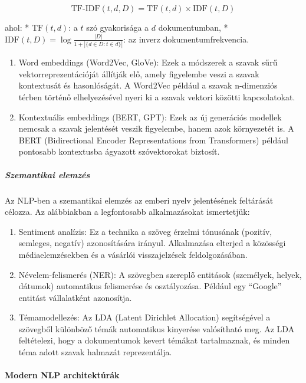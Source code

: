 \documentclass[11pt]{article}
\begin{document}
\[\text{TF-IDF}(t, d, D) = \text{TF}(t, d) \times \text{IDF}(t, D)\]

ahol: * \(\text{TF}(t, d)\): a \(t\) szó gyakorisága a \(d\)
dokumentumban, *
\(\text{IDF}(t, D) = \log \frac{|D|}{1 + |\{d \in D : t \in d\}|}\): az
inverz dokumentumfrekvencia.

\begin{enumerate}
\def\labelenumi{\arabic{enumi}.}
\setcounter{enumi}{2}
\item
  Word embeddings (Word2Vec, GloVe): Ezek a módszerek a szavak sűrű
  vektorreprezentációját állítják elő, amely figyelembe veszi a szavak
  kontextusát és hasonlóságát. A Word2Vec például a szavak n-dimenziós
  térben történő elhelyezésével nyeri ki a szavak vektori közötti
  kapcsolatokat.
\item
  Kontextuális embeddings (BERT, GPT): Ezek az új generációs modellek
  nemcsak a szavak jelentését veszik figyelembe, hanem azok környezetét
  is. A BERT (Bidirectional Encoder Representations from Transformers)
  például pontosabb kontextusba ágyazott szóvektorokat biztosít.
\end{enumerate}

\subparagraph{Szemantikai elemzés}\label{szemantikai-elemzuxe9s}

Az NLP-ben a szemantikai elemzés az emberi nyelv jelentésének feltárását
célozza. Az alábbiakban a legfontosabb alkalmazásokat ismertetjük:

\begin{enumerate}
\def\labelenumi{\arabic{enumi}.}
\item
  Sentiment analízis: Ez a technika a szöveg érzelmi tónusának (pozitív,
  semleges, negatív) azonosítására irányul. Alkalmazása elterjed a
  közösségi médiaelemzésekben és a vásárlói visszajelzések
  feldolgozásában.
\item
  Névelem-felismerés (NER): A szövegben szereplő entitások (személyek,
  helyek, dátumok) automatikus felismerése és osztályozása. Például egy
  ``Google'' entitást vállalatként azonosítja.
\item
  Témamodellezés: Az LDA (Latent Dirichlet Allocation) segítségével a
  szövegből különböző témák automatikus kinyerése valósítható meg. Az
  LDA feltételezi, hogy a dokumentumok kevert témákat tartalmaznak, és
  minden téma adott szavak halmazát reprezentálja.
\end{enumerate}

\paragraph{Modern NLP
architektúrák}\label{modern-nlp-architektuxfaruxe1k}
\end{document}
